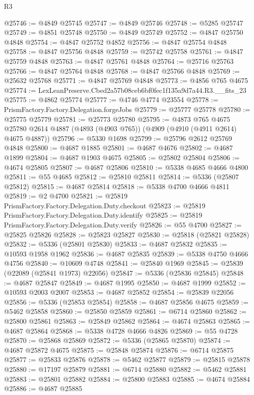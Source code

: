 \begin{lexlean}{R3}
\begin{coremodule}
@25746 := @4849 @25745
@25747 := @4849 @25746
@25748 := @5285 @25747
@25749 := @4851 @25748
@25750 := @4849 @25749
@25752 := @4847 @25750 @4848
@25754 := @4847 @25752 @4852
@25756 := @4847 @25754 @4848
@25758 := @4847 @25756 @4848
@25759 := @25742 @25758
@25761 := @4847 @25759 @4848
@25763 := @4847 @25761 @4848
@25764 := @25716 @25763
@25766 := @4847 @25764 @4848
@25768 := @4847 @25766 @4848
@25769 := @25632 @25768
@25771 := @4847 @25769 @4848
@25773 := @4856 @765 @4675
@25774 := LexLeanPreserve.Cbed2a57b08ceb6bf0fec1f135a9d7a44.R3.__fits_23
@25775 := @4862 @25774
@25777 := @4746 @4774 @23554
@25778 := PrismFactory.Factory.Delegation.forgeJobs
@25779 := @25777 @25778
@25780 := @25775 @25779
@25781 := @25773 @25780
@25795 := @4873
    @765
    @4675
    @25780
    @2614
    @4887
    (@4893 (@4903 @765))
    (@4909 (@4910 (@4911 @2614) @4675 @4887))
@25796 := @5330 @1698
@25799 := @25796 @2612 @25769 @4848
@25800 := @4687 @1885
@25801 := @4687 @4676
@25802 := @4687 @1899
@25804 := @4687 @1903 @4675
@25805 := @25802 @25804
@25806 := @4674 @25805
@25807 := @4687 @25806
@25810 := @5338 @4685 @4666 @4800
@25811 := @55 @4685
@25812 := @25810 @25811
@25814 := @5336 (@25807 @25812)
@25815 := @4687 @25814
@25818 := @5338 @4700 @4666 @4811
@25819 := @2 @4700
@25821 := @25819 PrismFactory.Factory.Delegation.Duty.checkout
@25823 := @25819 PrismFactory.Factory.Delegation.Duty.identify
@25825 := @25819 PrismFactory.Factory.Delegation.Duty.verify
@25826 := @55 @4700
@25827 := @25825 @25826
@25828 := @25823 @25827
@25830 := @25818 (@25821 @25828)
@25832 := @5336 (@25801 @25830)
@25833 := @4687 @25832
@25835 := @10593 @1958 @1962
@25836 := @4687 @25835
@25839 := @5338 @4750 @4666 @4756
@25840 := @10609 @4748
@25841 := @25840 @1969
@25845 := @25839 (@22089 (@25841 @1973) @22056)
@25847 := @5336 (@25836 @25845)
@25848 := @4687 @25847
@25849 := @4687 @1995
@25850 := @4687 @1999
@25852 := @10593 @2003 @2007
@25853 := @4687 @25852
@25854 := @25839 @22056
@25856 := @5336 (@25853 @25854)
@25858 := @4687 @25856 @4675
@25859 := @5462 @25858
@25860 := @25850 @25859
@25861 := @6714 @25860
@25862 := @25800 @25861
@25863 := @25849 @25862
@25864 := @4674 @25863
@25865 := @4687 @25864
@25868 := @5338 @4728 @4666 @4826
@25869 := @55 @4728
@25870 := @25868 @25869
@25872 := @5336 (@25865 @25870)
@25874 := @4687 @25872 @4675
@25875 := @25848 @25874
@25876 := @6714 @25875
@25877 := @25833 @25876
@25878 := @5462 @25877
@25879 := @25815 @25878
@25880 := @17197 @25879
@25881 := @6714 @25880
@25882 := @5462 @25881
@25883 := @25801 @25882
@25884 := @25800 @25883
@25885 := @4674 @25884
@25886 := @4687 @25885

\end{coremodule}
\end{lexlean}
